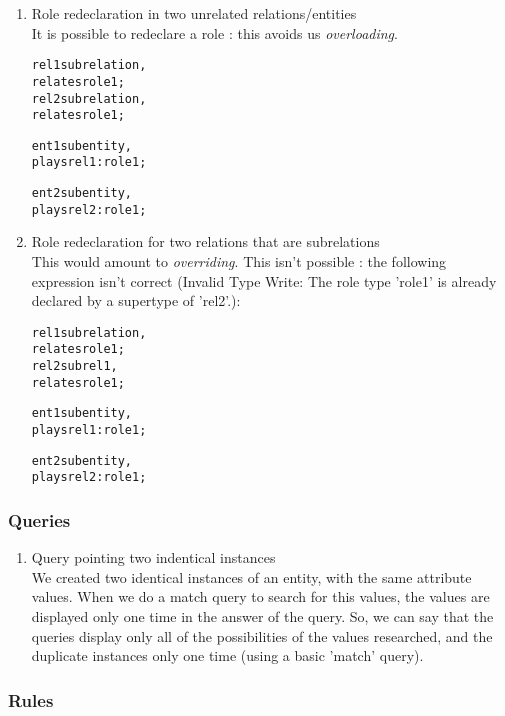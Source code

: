 \documentclass[runningheads]{llncs}
\begin{document}
\begin{enumerate}
\item Role redeclaration in two unrelated relations/entities \\
It is possible to redeclare a role : this avoids us \emph{overloading}.

  \begin{alltt}
rel1 sub relation,
     relates role1;
rel2 sub relation,
     relates role1;

ent1 sub entity,
  plays rel1:role1;

ent2 sub entity,
  plays rel2:role1;
  \end{alltt}
 
\item Role redeclaration for two relations that are subrelations \\
This would amount to \emph{overriding}. This isn't possible : the following expression isn't correct (Invalid Type Write: The role type 'role1' is already declared by a supertype of 'rel2'.): 
  
  \begin{alltt}
rel1 sub relation,
     relates role1;
rel2 sub rel1,
     relates role1;

ent1 sub entity,
  plays rel1:role1;

ent2 sub entity,
  plays rel2:role1;
  \end{alltt}
  

\end{enumerate}

\subsubsection{Queries}

\begin{enumerate}
\item Query pointing two indentical instances \\
We created two identical instances of an entity, with the same attribute values. When we do a match query to search for this values, the values are displayed only one time in the answer of the query.
So, we can say that the queries display only all of the possibilities of the values researched, and the duplicate instances only one time (using a basic 'match' query).



\end{enumerate}

\subsubsection{Rules}
\end{document}
